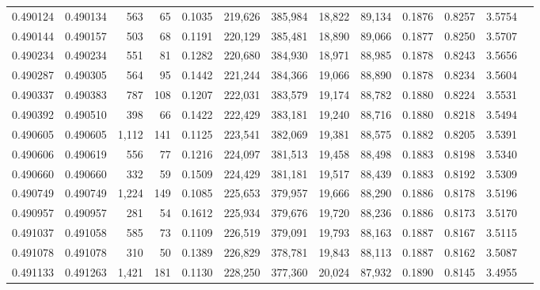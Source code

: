 \begin{tabular}{rrrrrrrrrrrrr}
0.490124 & 0.490134 &   563 &    65 &                                     0.1035 & 219,626 & 385,984 &  18,822 &  89,134 & 0.1876 & 0.8257 & 3.5754 \\
0.490144 & 0.490157 &   503 &    68 &                                     0.1191 & 220,129 & 385,481 &  18,890 &  89,066 & 0.1877 & 0.8250 & 3.5707 \\
0.490234 & 0.490234 &   551 &    81 &                                     0.1282 & 220,680 & 384,930 &  18,971 &  88,985 & 0.1878 & 0.8243 & 3.5656 \\
0.490287 & 0.490305 &   564 &    95 &                                     0.1442 & 221,244 & 384,366 &  19,066 &  88,890 & 0.1878 & 0.8234 & 3.5604 \\
0.490337 & 0.490383 &   787 &   108 &                                     0.1207 & 222,031 & 383,579 &  19,174 &  88,782 & 0.1880 & 0.8224 & 3.5531 \\
0.490392 & 0.490510 &   398 &    66 &                                     0.1422 & 222,429 & 383,181 &  19,240 &  88,716 & 0.1880 & 0.8218 & 3.5494 \\
0.490605 & 0.490605 & 1,112 &   141 &                                     0.1125 & 223,541 & 382,069 &  19,381 &  88,575 & 0.1882 & 0.8205 & 3.5391 \\
0.490606 & 0.490619 &   556 &    77 &                                     0.1216 & 224,097 & 381,513 &  19,458 &  88,498 & 0.1883 & 0.8198 & 3.5340 \\
0.490660 & 0.490660 &   332 &    59 &                                     0.1509 & 224,429 & 381,181 &  19,517 &  88,439 & 0.1883 & 0.8192 & 3.5309 \\
0.490749 & 0.490749 & 1,224 &   149 &                                     0.1085 & 225,653 & 379,957 &  19,666 &  88,290 & 0.1886 & 0.8178 & 3.5196 \\
0.490957 & 0.490957 &   281 &    54 &                                     0.1612 & 225,934 & 379,676 &  19,720 &  88,236 & 0.1886 & 0.8173 & 3.5170 \\
0.491037 & 0.491058 &   585 &    73 &                                     0.1109 & 226,519 & 379,091 &  19,793 &  88,163 & 0.1887 & 0.8167 & 3.5115 \\
0.491078 & 0.491078 &   310 &    50 &                                     0.1389 & 226,829 & 378,781 &  19,843 &  88,113 & 0.1887 & 0.8162 & 3.5087 \\
0.491133 & 0.491263 & 1,421 &   181 &                                     0.1130 & 228,250 & 377,360 &  20,024 &  87,932 & 0.1890 & 0.8145 & 3.4955 \\

\end{tabular}
